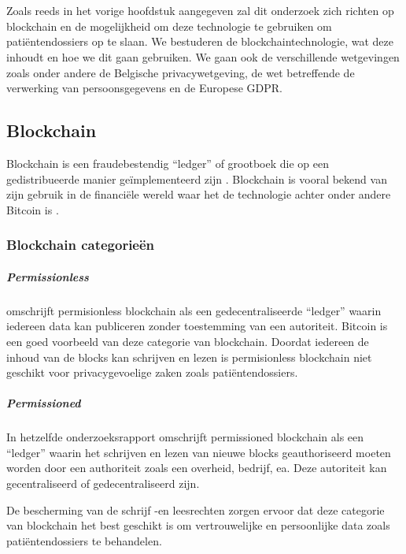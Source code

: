 \chapter{}
\label{ch:stand-van-zaken}

Zoals reeds in het vorige hoofdstuk aangegeven zal dit onderzoek zich richten op blockchain en de mogelijkheid om deze technologie te gebruiken om patiëntendossiers op te slaan. We bestuderen de blockchaintechnologie, wat deze inhoudt en hoe we dit gaan gebruiken. We gaan ook de verschillende wetgevingen zoals onder andere de Belgische privacywetgeving, de wet betreffende de verwerking van persoonsgegevens en de Europese GDPR.
\section{Blockchain}
\label{ch:blockchain}

Blockchain is een fraudebestendig ``ledger'' of grootboek die op een gedistribueerde manier geïmplementeerd zijn \autocite{Yaga2018}. Blockchain is vooral bekend van zijn gebruik in de financiële wereld waar het de technologie achter onder andere Bitcoin is \autocite{Nofer2017}. 

\subsection{Blockchain categorieën}

\paragraph{Permissionless}

\textcite{Yaga2018} omschrijft permisionless blockchain als een gedecentraliseerde ``ledger'' waarin iedereen data kan publiceren zonder toestemming van een autoriteit. Bitcoin is een goed voorbeeld van deze categorie van blockchain. Doordat iedereen de inhoud van de blocks kan schrijven en lezen is permisionless blockchain niet geschikt voor privacygevoelige zaken zoals patiëntendossiers.


\paragraph{Permissioned}

In hetzelfde onderzoeksrapport omschrijft \textcite{Yaga2018} permissioned blockchain als een ``ledger'' waarin het schrijven en lezen van nieuwe blocks geauthoriseerd moeten worden door een authoriteit zoals een overheid, bedrijf, ea. Deze autoriteit kan gecentraliseerd of gedecentraliseerd zijn.

De bescherming van de schrijf -en leesrechten zorgen ervoor dat deze categorie van blockchain het best geschikt is om vertrouwelijke en persoonlijke data zoals patiëntendossiers te behandelen.

